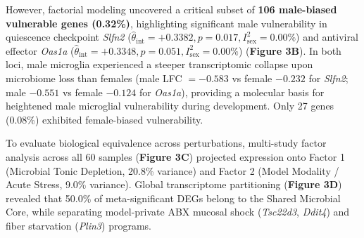 \documentclass[10pt,a4paper]{article}
\begin{document}
However, factorial modeling uncovered a critical subset of \textbf{106 male-biased vulnerable genes (0.32\%)}, highlighting significant male vulnerability in quiescence checkpoint \textit{Slfn2} ($\hat{\theta}_{\text{int}} = +0.3382, p = 0.017, I^2_{\text{sex}} = 0.00\%$) and antiviral effector \textit{Oas1a} ($\hat{\theta}_{\text{int}} = +0.3348, p = 0.051, I^2_{\text{sex}} = 0.00\%$) (\textbf{Figure 3B}). In both loci, male microglia experienced a steeper transcriptomic collapse upon microbiome loss than females (male LFC $= -0.583$ vs female $-0.232$ for \textit{Slfn2}; male $-0.551$ vs female $-0.124$ for \textit{Oas1a}), providing a molecular basis for heightened male microglial vulnerability during development\cite{thion2018_42,villa2018_43}. Only 27 genes (0.08\%) exhibited female-biased vulnerability.

To evaluate biological equivalence across perturbations, multi-study factor analysis across all 60 samples (\textbf{Figure 3C}) projected expression onto Factor 1 (Microbial Tonic Depletion, 20.8\% variance) and Factor 2 (Model Modality / Acute Stress, 9.0\% variance). Global transcriptome partitioning (\textbf{Figure 3D}) revealed that 50.0\% of meta-significant DEGs belong to the Shared Microbial Core, while separating model-private ABX mucosal shock (\textit{Tsc22d3}, \textit{Ddit4}) and fiber starvation (\textit{Plin3}) programs.
\end{document}
